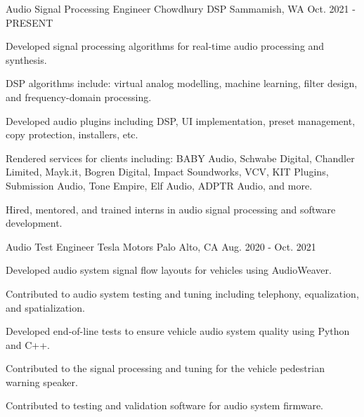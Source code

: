 

\begin{cventries}

  \cventry
    {Audio Signal Processing Engineer} %
    {Chowdhury DSP} %
    {Sammamish, WA} %
    {Oct. 2021 - PRESENT} %
    {
      \begin{cvitems} %
        \item {Developed signal processing algorithms for real-time audio processing and synthesis.}
        \item {DSP algorithms include: virtual analog modelling, machine learning, filter design, and frequency-domain processing.}
        \item {Developed audio plugins including DSP, UI implementation, preset management, copy protection, installers, etc.}
        \item {Rendered services for clients including: BABY Audio, Schwabe Digital, Chandler Limited, Mayk.it, Bogren Digital, Impact Soundworks,
        VCV, KIT Plugins, Submission Audio, Tone Empire, Elf Audio, ADPTR Audio, and more.}
        \item {Hired, mentored, and trained interns in audio signal processing and software development.}
      \end{cvitems}
    }

  \cventry
    {Audio Test Engineer} %
    {Tesla Motors} %
    {Palo Alto, CA} %
    {Aug. 2020 - Oct. 2021} %
    {
      \begin{cvitems} %
        \item {Developed audio system signal flow layouts for vehicles using AudioWeaver.}
        \item {Contributed to audio system testing and tuning including telephony, equalization, and spatialization.}
        \item {Developed end-of-line tests to ensure vehicle audio system quality using Python and C++.}
        \item {Contributed to the signal processing and tuning for the vehicle pedestrian warning speaker.}
        \item {Contributed to testing and validation software for audio system firmware.}
      \end{cvitems}
    }


\end{cventries}
